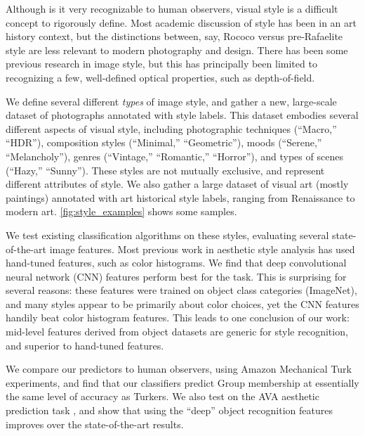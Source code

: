 Although is it very recognizable to human observers, visual style is a difficult concept to rigorously define.
Most academic discussion of style has been in an art history context, but the distinctions between, say, Rococo versus pre-Rafaelite style are less relevant to modern photography and design.
There has been some previous research in image style, but this has principally been limited to recognizing a few, well-defined optical properties, such as depth-of-field.

We define several different \textit{types} of image style, and gather a new, large-scale dataset of photographs annotated with style labels.
This dataset embodies several different aspects of visual style, including photographic techniques  (``Macro,'' ``HDR''), composition styles (``Minimal,'' ``Geometric''), moods (``Serene,'' ``Melancholy''), genres (``Vintage,'' ``Romantic,'' ``Horror''), and types of scenes (``Hazy,'' ``Sunny'').
These styles are not mutually exclusive, and represent different attributes of style.
We  also gather a large dataset of visual art (mostly paintings) annotated with art historical style labels, ranging from Renaissance to modern art.
\autoref{fig:style_examples} shows some samples.

We test existing classification algorithms on these styles, evaluating several state-of-the-art image features.
Most previous work in aesthetic style analysis has  used hand-tuned features, such as color histograms.
We find that deep convolutional neural network (CNN) features perform best for the task.
This is surprising for several reasons: these features were trained on object class categories (ImageNet), and many styles appear to be primarily about color choices, yet the CNN features handily beat color histogram features.
This leads to one conclusion of our work: mid-level features derived from object datasets are generic for style recognition, and superior to hand-tuned features.

We compare our predictors to human observers, using Amazon Mechanical Turk experiments, and find that our classifiers predict Group membership at essentially the same level of accuracy as Turkers.
We also test on the AVA aesthetic prediction task \parencite{Murray-CVPR-2012}, and show that using the ``deep'' object recognition features improves over the state-of-the-art results.

